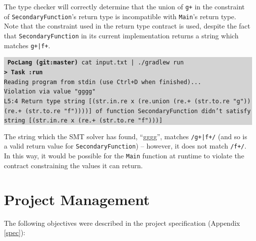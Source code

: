 \documentclass[a4paper]{article}
\newcommand{\termbox}[1] {\colorbox{lightgrey}{\parbox{\textwidth}{\vspace{.75\baselineskip}\centering\parbox{0.95\textwidth}{ \sffamily#1\vspace{.75\baselineskip}}}}}
\begin{document}
The type checker will correctly determine that the union of \texttt{g+} in the constraint of \texttt{SecondaryFunction}'s return type is incompatible with \texttt{Main}'s return type. Note that the constraint used in the return type contract is used, despite the fact that \texttt{SecondaryFunction} in its current implementation returns a string which matches \texttt{g+|f+}.

\termbox{
    \texttt{\textcolor{term-green}{} \ttfamily \textbf{\textcolor{term-dir}{PocLang} \textcolor{term-git}{(git:}\textcolor{term-branch}{master}\textcolor{term-git}{)}} cat input.txt | ./gradlew run}\\
    \texttt{\textbf{> Task :run}}\\
    \textcolor{term-green}{\texttt{Reading program from stdin (use Ctrl+D when finished)...}}\\
    \textcolor{id7-ruby-red}{\texttt{Violation via value "gggg"}}\\
    \textcolor{id7-ruby-red}{\texttt{L5:4 Return type string [(str.in.re x (re.union (re.+ (str.to.re "g")) (re.+ (str.to.re "f"))))] of function SecondaryFunction didn't satisfy string [(str.in.re x (re.+ (str.to.re "f")))]}}
}

The string which the SMT solver has found, ``gggg'', matches \texttt{/g+|f+/} (and so is a valid return value for \texttt{SecondaryFunction}) -- however, it does not match \texttt{/f+/}. In this way, it would be possible for the \texttt{Main} function at runtime to violate the contract constraining the values it can return.


\section{Project Management}

The following objectives were described in the project specification (Appendix \ref{spec}):
\end{document}
